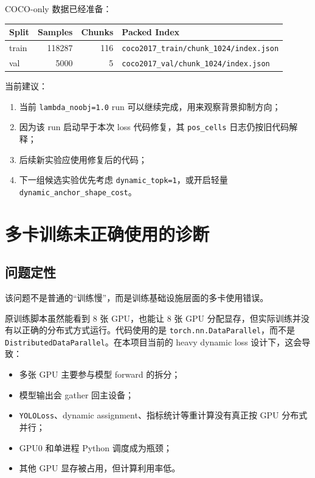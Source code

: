 \documentclass[UTF8]{ctexart}
\begin{document}
COCO-only 数据已经准备：

\begin{center}
\begin{tabular}{lrrl}
\toprule
Split & Samples & Chunks & Packed Index \\
\midrule
train & 118287 & 116 & \texttt{coco2017\_train/chunk\_1024/index.json} \\
val & 5000 & 5 & \texttt{coco2017\_val/chunk\_1024/index.json} \\
\bottomrule
\end{tabular}
\end{center}

当前建议：

\begin{enumerate}[leftmargin=2em]
  \item 当前 \texttt{lambda\_noobj=1.0} run 可以继续完成，用来观察背景抑制方向；
  \item 因为该 run 启动早于本次 loss 代码修复，其 \texttt{pos\_cells} 日志仍按旧代码解释；
  \item 后续新实验应使用修复后的代码；
  \item 下一组候选实验优先考虑 \texttt{dynamic\_topk=1}，或开启轻量 \texttt{dynamic\_anchor\_shape\_cost}。
\end{enumerate}

\section{多卡训练未正确使用的诊断}

\subsection{问题定性}

该问题不是普通的“训练慢”，而是训练基础设施层面的多卡使用错误。

原训练脚本虽然能看到 8 张 GPU，也能让 8 张 GPU 分配显存，但实际训练并没有以正确的分布式方式运行。代码使用的是 \texttt{torch.nn.DataParallel}，而不是 \texttt{DistributedDataParallel}。在本项目当前的 heavy dynamic loss 设计下，这会导致：

\begin{itemize}[leftmargin=2em]
  \item 多张 GPU 主要参与模型 forward 的拆分；
  \item 模型输出会 gather 回主设备；
  \item \texttt{YOLOLoss}、dynamic assignment、指标统计等重计算没有真正按 GPU 分布式并行；
  \item GPU0 和单进程 Python 调度成为瓶颈；
  \item 其他 GPU 显存被占用，但计算利用率低。
\end{itemize}
\end{document}

